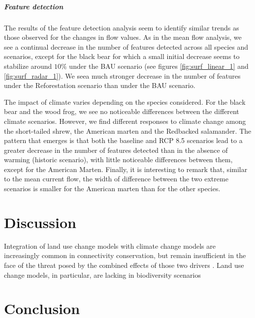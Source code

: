 \vspace{1em}

\subparagraph*{\textit{Feature detection}} The results of the feature detection analysis seem to identify similar trends as those observed for the changes in flow values. As in the mean flow analysis, we see a continual decrease in the number of features detected across all species and scenarios, except for the black bear for which a small initial decrease seems to stabilize around $10\%$ under the BAU scenario (see figures \ref{fig:surf_linear_1} and \ref{fig:surf_radar_1}). We seea much stronger decrease in the number of features under the Reforestation scenario than under the BAU scenario.

The impact of climate varies depending on the species considered. For the black bear and the wood frog, we see no noticeable differences between the different climate scenarios. However, we find different responses to climate change among the short-tailed shrew, the American marten and the Redbacked salamander. The pattern that emerges is that both the baseline and RCP 8.5 scenarios lead to a greater decrease in the number of features detected than in the absence of warming (historic scenario), with little noticeable differences between them, except for the American Marten. Finally, it is interesting to remark that, similar to the mean  current flow, the width of difference between the two extreme scenarios is smaller for the American marten than for the other species.\\

\section{Discussion}

Integration of land use change models with climate change models are increasingly common in connectivity conservation, but remain insufficient in the face of the threat posed by the combined effects of those two drivers \citep{costanza_landscape_2019}. Land use change models, in particular, are lacking in biodiversity scenarios \citep{}

\section{Conclusion}


